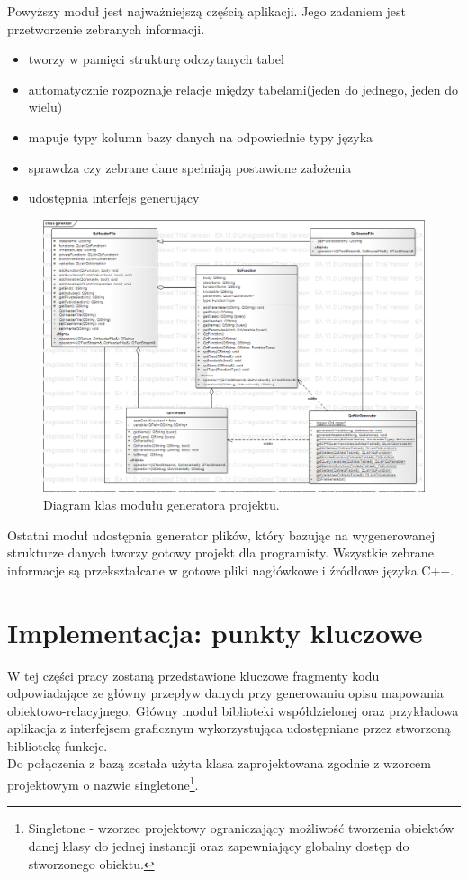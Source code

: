 \documentclass[12pt]{report}
\begin{document}
Powyższy moduł jest najważniejszą częścią aplikacji. Jego zadaniem jest przetworzenie zebranych informacji.
\begin{itemize}
\item{tworzy w pamięci strukturę odczytanych tabel}
\item{automatycznie rozpoznaje relacje między tabelami(jeden do jednego, jeden do wielu)}
\item{mapuje typy kolumn bazy danych na odpowiednie typy języka}
\item{sprawdza czy zebrane dane spełniają postawione założenia}
\item{udostępnia interfejs generujący}
\end{itemize}

\begin{figure}[h]
	\centering
	\includegraphics[width=1.1\textwidth]{images/generator.png}
	\caption{Diagram klas modułu generatora projektu.}
\end{figure}
\FloatBarrier	

Ostatni moduł udostępnia generator plików, który bazując na wygenerowanej strukturze danych tworzy gotowy projekt dla programisty. Wszystkie zebrane informacje są przekształcane w gotowe pliki nagłówkowe i źródłowe języka C++.

\section{Implementacja: punkty kluczowe}
W tej części pracy zostaną przedstawione kluczowe fragmenty kodu odpowiadające ze główny przepływ danych przy generowaniu opisu mapowania obiektowo-relacyjnego. Główny moduł biblioteki współdzielonej oraz przykładowa aplikacja z interfejsem graficznym wykorzystująca udostępniane przez stworzoną bibliotekę funkcje. \\
	\indent Do połączenia z bazą została użyta klasa zaprojektowana zgodnie z wzorcem projektowym o nazwie singletone\footnote{Singletone - wzorzec projektowy ograniczający możliwość tworzenia obiektów danej klasy do jednej instancji oraz zapewniający globalny dostęp do stworzonego obiektu.}. 
	
\end{document}
